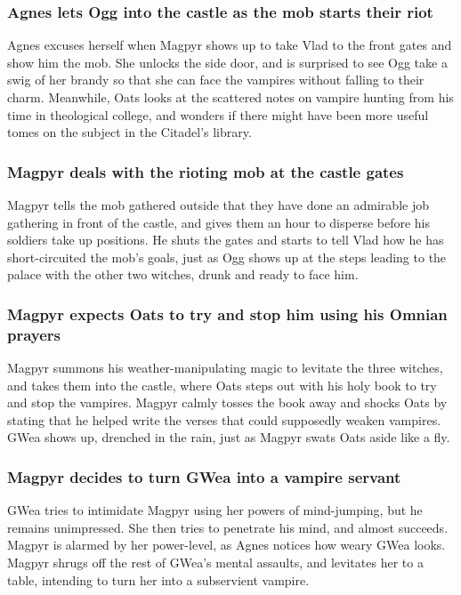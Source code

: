 \subsubsection{\Gls{Agnes} lets \Gls{Ogg} into the castle as the mob starts their riot}
\Gls{Agnes} excuses herself when \Gls{Magpyr} shows up to take \Gls{Vlad} to the front gates and
show him the mob. She unlocks the side door, and is surprised to see \Gls{Ogg} take a swig of her
brandy so that she can face the vampires without falling to their charm. Meanwhile, \Gls{Oats} looks
at the scattered notes on vampire hunting from his time in theological college, and wonders if there
might have been more useful tomes on the subject in the Citadel's library.

\subsubsection{\Gls{Magpyr} deals with the rioting mob at the castle gates}
\Gls{Magpyr} tells the mob gathered outside that they have done an admirable job gathering in front
of the castle, and gives them an hour to disperse before his soldiers take up positions. He shuts
the gates and starts to tell \Gls{Vlad} how he has short-circuited the mob's goals, just as
\Gls{Ogg} shows up at the steps leading to the palace with the other two witches, drunk and ready
to face him.

\subsubsection{\Gls{Magpyr} expects \Gls{Oats} to try and stop him using his Omnian prayers}
\Gls{Magpyr} summons his weather-manipulating magic to levitate the three witches, and takes them
into the castle, where \Gls{Oats} steps out with his holy book to try and stop the vampires.
\Gls{Magpyr} calmly tosses the book away and shocks \Gls{Oats} by stating that he helped write the
verses that could supposedly weaken vampires. \Gls{GWea} shows up, drenched in the rain, just as
\Gls{Magpyr} swats \Gls{Oats} aside like a fly.

\subsubsection{\Gls{Magpyr} decides to turn \Gls{GWea} into a vampire servant}
\Gls{GWea} tries to intimidate \Gls{Magpyr} using her powers of mind-jumping, but he remains
unimpressed. She then tries to penetrate his mind, and almost succeeds. \Gls{Magpyr} is alarmed by
her power-level, as \Gls{Agnes} notices how weary \Gls{GWea} looks. \Gls{Magpyr} shrugs off the
rest of \Gls{GWea}'s mental assaults, and levitates her to a table, intending to turn her into a
subservient vampire.

